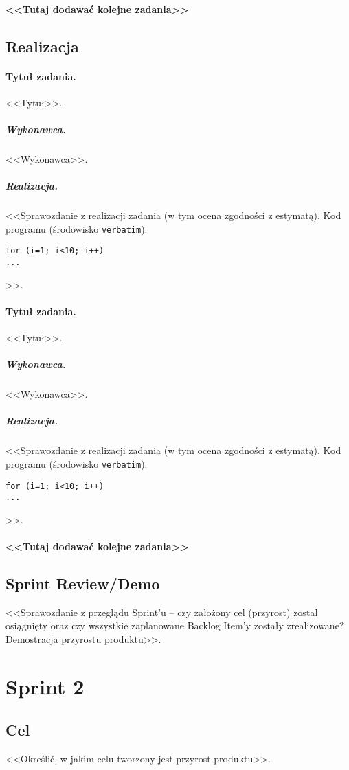 \documentclass[a4paper]{article}
\begin{document}
\paragraph{<<Tutaj dodawać kolejne zadania>>}

\subsection{Realizacja}

\paragraph{Tytuł zadania.} <<Tytuł>>.
\subparagraph{Wykonawca.} <<Wykonawca>>.
\subparagraph{Realizacja.} <<Sprawozdanie z realizacji zadania (w tym ocena zgodności z estymatą). Kod programu (środowisko \texttt{verbatim}): \begin{verbatim}
for (i=1; i<10; i++)
...
\end{verbatim}>>.

\paragraph{Tytuł zadania.} <<Tytuł>>.
\subparagraph{Wykonawca.} <<Wykonawca>>.
\subparagraph{Realizacja.} <<Sprawozdanie z realizacji zadania (w tym ocena zgodności z estymatą). Kod programu (środowisko \texttt{verbatim}): \begin{verbatim}
for (i=1; i<10; i++)
...
\end{verbatim}>>.

\paragraph{<<Tutaj dodawać kolejne zadania>>}


\subsection{Sprint Review/Demo}
<<Sprawozdanie z przeglądu Sprint'u -- czy założony cel (przyrost) został osiągnięty oraz czy wszystkie zaplanowane Backlog Item'y zostały zrealizowane? Demostracja przyrostu produktu>>.

\section{Sprint 2}

\subsection{Cel} <<Określić, w jakim celu tworzony jest przyrost produktu>>.
\end{document}
